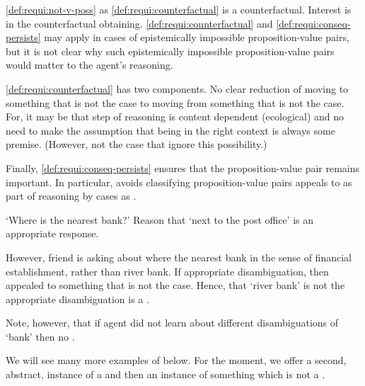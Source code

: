 \begin{note}
  \ref{def:requi:not-v-poss} as \ref{def:requi:counterfactual} is a counterfactual.
  Interest is in the counterfactual obtaining.
  \ref{def:requi:counterfactual} and \ref{def:requi:conseq-persists} may apply in cases of epistemically impossible proposition-value pairs, but it is not clear why such epistemically impossible proposition-value pairs would matter to the agent's reasoning.

  \ref{def:requi:counterfactual} has two components.
  No clear reduction of moving to something that is not the case to moving from something that is not the case.
  For, it may be that step of reasoning is content dependent {\color{red} (ecological)} and no need to make the assumption that being in the right context is always some premise.
  (However, not the case that ignore this possibility.)

  Finally, \ref{def:requi:conseq-persists} ensures that the proposition-value pair remains important.
  In particular, avoids classifying proposition-value pairs appeals to as part of reasoning by cases as .
\end{note}

\begin{note}
  \begin{illustration}
    \label{illu:requ:bank}
    `Where is the nearest bank?'
    Reason that `next to the post office' is an appropriate response.
  \end{illustration}
  However, friend is asking about where the nearest bank in the sense of financial establishment, rather than river bank.
  If appropriate disambiguation, then appealed to something that is not the case.
  Hence, that `river bank' is not the appropriate disambiguation is a \requ{}.

  Note, however, that if agent did not learn about different disambiguations of `bank' then no \requ{}.
\end{note}

\begin{note}
  We will see many more examples of  below.
  For the moment, we offer a second, abstract, instance of a \requ{} and then an instance of something which is not a \requ{}.
\end{note}

